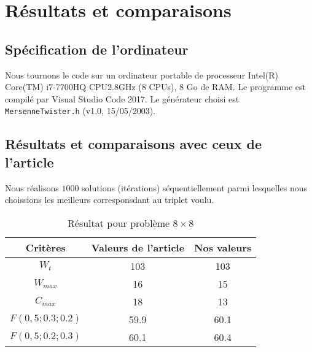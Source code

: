 \documentclass[10pt,a4paper]{scrartcl}
\begin{document}
%            
%           
%            
%            
%	        
%	        
%	        

\section{Résultats et comparaisons}
%
\subsection{Spécification de l'ordinateur}
Nous tournons le code sur un ordinateur portable de processeur Intel(R) Core(TM) i7-7700HQ CPU\@2.8GHz (8 CPUs), 8 Go de RAM. Le programme est compilé par Visual Studio Code 2017. Le générateur choisi est \texttt{MersenneTwister.h} (v1.0, 15/05/2003).

\subsection{Résultats et comparaisons avec ceux de l'article}
Nous réalisons $1000$ solutions (itérations) séquentiellement parmi lesquelles nous choissions les meilleurs corresponsdant au triplet voulu.
\begin{table}[!h]
  \centering
  \begin{tabular}{|c|c|c|}
    \hline
    Critères & Valeurs de l'article & Nos valeurs \\
    \hline
    $W_t$ & 103 & 103 \\
    $W_{max}$ & 16 & 15 \\
    $C_{max}$ & 18 & 13 \\
    $F(0,5;0.3;0.2)$ & 59.9 & 60.1 \\
    $F(0,5;0.2;0.3)$ & 60.1 & 60.4 \\
    \hline
  \end{tabular}
  \caption{Résultat pour problème $8 \times 8$}
\end{table}
\end{document}
